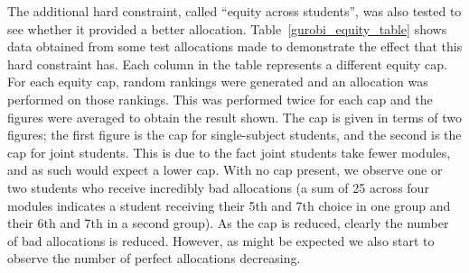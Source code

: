 The additional hard constraint, called ``equity across students'', was also
tested to see whether it provided a better allocation.
Table~\ref{gurobi_equity_table} shows data obtained from some test allocations
made to demonstrate the effect that this hard constraint has. Each column in
the table represents a different equity cap. For each equity cap, random
rankings were generated and an allocation was performed on those rankings.
This was performed twice for each cap and the figures were averaged to obtain
the result shown. The cap is given in terms of two figures; the first figure
is the cap for single-subject students, and the second is the cap for joint
students. This is due to the fact joint students take fewer modules, and as
such would expect a lower cap. With no cap present, we observe one or two
students who receive incredibly bad allocations (a sum of 25 across four
modules indicates a student receiving their 5th and 7th choice in one group
and their 6th and 7th in a second group). As the cap is reduced, clearly the
number of bad allocations is reduced. However, as might be expected we also
start to observe the number of perfect allocations decreasing.
